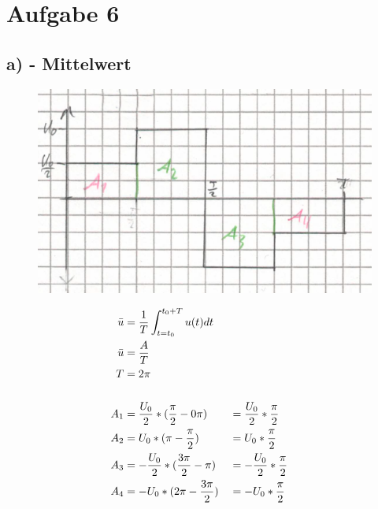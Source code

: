 \documentclass[../../document.tex]{subfiles}
\begin{document}
\section*{Aufgabe 6}

\subsection*{a) - Mittelwert}

\begin{figure}[H]
    \begin{center}
        \includegraphics[width=.9\linewidth]{../../img/aufg6-a}
    \end{center}
\end{figure}


\begin{equation*}
    \begin{split}
        \bar{u} &= \frac{1}{T} \int_{t=t_{\textrm{0}}}^{t_{\textrm{0}} + T} u(t) dt\\
        \bar{u} &= \frac{A}{T}\\
        T &= 2 \pi\\
        \\
        A_{\textrm{1}} &= \frac{U_{\textrm{0}}}{2} * (\frac{\pi}{2} - 0\pi) &&= \frac{U_{\textrm{0}}}{2} * \frac{\pi}{2}\\
        A_{\textrm{2}} &= U_{\textrm{0}} * (\pi - \frac{\pi}{2}) &&= U_{\textrm{0}} * \frac{\pi}{2}\\
        A_{\textrm{3}} &= -\frac{U_{\textrm{0}}}{2} * (\frac{3\pi}{2} - \pi) &&= -\frac{U_{\textrm{0}}}{2} * \frac{\pi}{2}\\
        A_{\textrm{4}} &= -U_{\textrm{0}} * (2\pi - \frac{3\pi}{2}) &&= -U_{\textrm{0}} * \frac{\pi}{2}\\
        \\
    \end{split}
\end{equation*}
\end{document}

